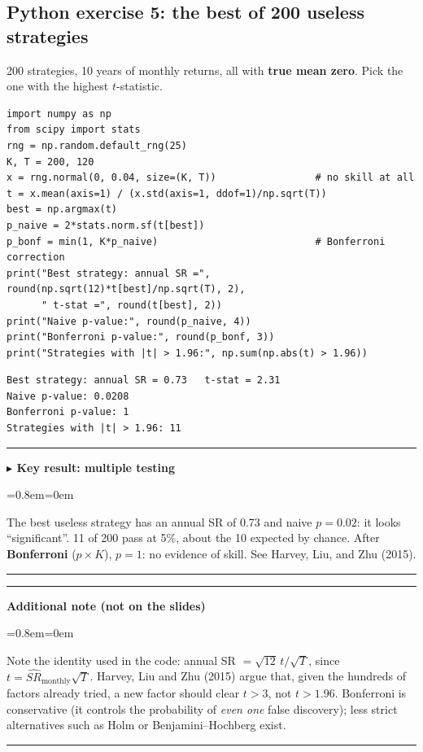 \documentclass[11pt,a4paper]{report}
\newenvironment{notebox}[1]
  {\par\medskip\Needspace{6\baselineskip}\noindent\rule{\linewidth}{0.4pt}\par\nopagebreak
   \noindent\textbf{#1}\par\nopagebreak
   \begin{list}{}{\leftmargin=0.8em\rightmargin=0em\topsep=2pt}\item[]}
  {\end{list}\nopagebreak\noindent\rule{\linewidth}{0.4pt}\par\medskip}
\newenvironment{keybox}[1][]{\begin{notebox}{$\blacktriangleright$ Key result#1}}{\end{notebox}}
\newenvironment{addnote}{\begin{notebox}{Additional note (not on the slides)}}{\end{notebox}}
\begin{document}
\subsection*{Python exercise 5: the best of 200 useless strategies}
200 strategies, 10 years of monthly returns, all with \textbf{true mean zero}.
Pick the one with the highest $t$-statistic.
\begin{lstlisting}
import numpy as np
from scipy import stats
rng = np.random.default_rng(25)
K, T = 200, 120
x = rng.normal(0, 0.04, size=(K, T))                 # no skill at all
t = x.mean(axis=1) / (x.std(axis=1, ddof=1)/np.sqrt(T))
best = np.argmax(t)
p_naive = 2*stats.norm.sf(t[best])
p_bonf = min(1, K*p_naive)                           # Bonferroni correction
print("Best strategy: annual SR =", round(np.sqrt(12)*t[best]/np.sqrt(T), 2),
      " t-stat =", round(t[best], 2))
print("Naive p-value:", round(p_naive, 4))
print("Bonferroni p-value:", round(p_bonf, 3))
print("Strategies with |t| > 1.96:", np.sum(np.abs(t) > 1.96))
\end{lstlisting}
\begin{lstlisting}[style=out]
Best strategy: annual SR = 0.73   t-stat = 2.31
Naive p-value: 0.0208
Bonferroni p-value: 1
Strategies with |t| > 1.96: 11
\end{lstlisting}
\begin{keybox}[: multiple testing]
The best useless strategy has an annual SR of 0.73 and naive $p=0.02$: it looks
``significant''. 11 of 200 pass at 5\%, about the 10 expected by chance. After
\textbf{Bonferroni} ($p\times K$), $p=1$: no evidence of skill. See Harvey, Liu,
and Zhu (2015).
\end{keybox}
\begin{addnote}
Note the identity used in the code: annual SR $=\sqrt{12}\,t/\sqrt T$, since
$t=\widehat{SR}_{\text{monthly}}\sqrt T$. Harvey, Liu and Zhu (2015) argue that,
given the hundreds of factors already tried, a new factor should clear
$t>3$, not $t>1.96$. Bonferroni is conservative (it controls the probability of
\emph{even one} false discovery); less strict alternatives such as Holm or
Benjamini--Hochberg exist.
\end{addnote}

\end{document}
